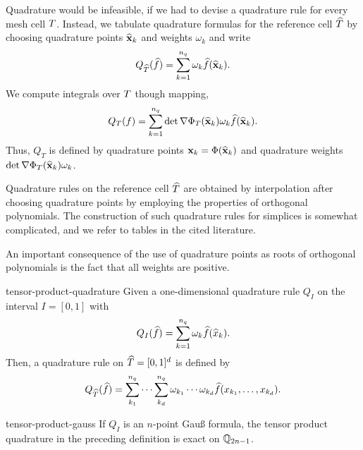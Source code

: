\begin{remark}
  Quadrature would be infeasible, if we had to devise a quadrature
  rule for every mesh cell $T$. Instead, we tabulate quadrature
  formulas for the reference cell $\widehat{T}$ by choosing quadrature
  points $\widehat{\mathbf x}_k$ and weights $\omega_k$ and write
  \begin{gather}
    Q_{\widehat{T}}(\widehat{f})
    = \sum_{k=1}^{n_q} \omega_k \widehat{f}(\widehat{\mathbf x}_k).
  \end{gather}
  We compute integrals over $T$ though mapping,
  \begin{gather}
    Q_T(f) = \sum_{k=1}^{n_q} \det\nabla\Phi_T(\widehat{\mathbf x}_k) \omega_k \widehat{f}(\widehat{\mathbf x}_k).
  \end{gather}
  Thus, $Q_T$ is defined by quadrature points
  $\mathbf x_k = \Phi(\widehat{\mathbf x}_k)$ and quadrature weights
  $\det\nabla\Phi_T(\widehat{\mathbf x}_k) \omega_k$.

  Quadrature rules on the reference cell $\widehat{T}$ are obtained by
  interpolation after choosing quadrature points by employing the
  properties of orthogonal polynomials.  The construction of such
  quadrature rules for simplices is somewhat complicated, and we refer
  to tables in the cited literature.

  An important consequence of the use of quadrature points as roots of
  orthogonal polynomials is the fact that all weights are positive.
\end{remark}

\begin{Definition}{tensor-product-quadrature}
  Given a one-dimensional quadrature rule $Q_I$ on the interval
  $I=[0,1]$ with
  \begin{gather}
    Q_I(\widehat{f}) = \sum_{k=1}^{n_q} \omega_k \widehat{f}(\widehat{x}_k).
  \end{gather}
  Then, a quadrature rule on $\widehat{T} = [0,1]^d$ is defined by
  \begin{gather}
    Q_{\widehat{T}}(\widehat{f})
    = \sum_{k_1}^{n_q}\dots\sum_{k_d}^{n_q} \omega_{k_1}\cdots\omega_{k_d}
    \widehat{f}(x_{k_1},\dots,x_{k_d}).
  \end{gather}
\end{Definition}

\begin{Lemma}{tensor-product-gauss}
  If $Q_I$ is an $n$-point Gauß formula, the tensor product quadrature
  in the preceding definition is exact on $\mathbb Q_{2n-1}$.
\end{Lemma}

